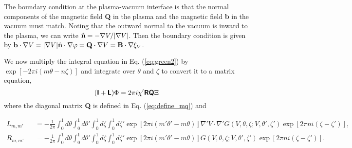 \documentclass[prb,twocolumn,showpacs,preprintnumbers,amsmath,amssymb]{revtex4}
\renewcommand*{\v}[1]{\hbox{\bfseries #1}}
\renewcommand*{\t}[1]{\hbox{\sffamily\bfseries #1}}
\begin{document}
The boundary condition at the plasma-vacuum interface is that the normal
components of the magnetic field \v{Q} in the plasma and the magnetic
field \v{b} in the vacuum must match.  Noting that the outward normal to
the vacuum is inward to the plasma, we can write $\hat{\v{n}} = -\nabla
V/|\nabla V|$.  Then the boundary condition is given by $ \v{b} \cdot
\nabla V =|\nabla V| \hat{\bf n} \cdot \nabla \varphi = \v{Q} \cdot
\nabla V = \v{B} \cdot \nabla \xi_V$.

We now multiply the integral equation in Eq. (\ref{eq:green2}) by
$\exp[-2 \pi i (m \theta - n \zeta)]$ and integrate over $\theta$ and
$\zeta$ to convert it to a matrix equation,
\begin{equation}
(\t{I} + \t{L}) \Phi
	= 2 \pi i \chi' \t{R} \t{Q} \Xi
\label{eq:int_equation}
\end{equation}
where the diagonal matrix \t{Q} is defined in Eq. (\ref{eq:define_mq})
and
\begin{widetext}
\begin{eqnarray}
L_{m,m'} &&= - \frac{1}{2 \pi} \int_0^1 d\theta \int_0^1 d\theta'
	\int_0^1 d\zeta \int_0^1 d\zeta' 
	\exp [ 2 \pi i (m' \theta' - m \theta)]
	\nabla' V \cdot \nabla' 
	G(V,\theta,\zeta;V,\theta',\zeta')
	\exp[2 \pi n i (\zeta - \zeta')], \nonumber \\
R_{m,m'} &&= - \frac{1}{2 \pi} \int_0^1 d\theta \int_0^1 d\theta'
	\int_0^1 d\zeta \int_0^1 d\zeta' 
	\exp [ 2 \pi i (m' \theta' - m \theta)]
	G(V,\theta,\zeta;V,\theta',\zeta')
	\exp[2 \pi n i (\zeta - \zeta')].
\label{eq:define_lr}
\end{eqnarray}
\end{widetext}
\end{document}
